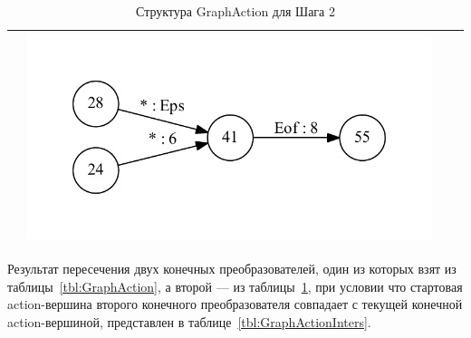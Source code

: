 \documentclass{matmex-diploma}
\begin{document}
\begin{table}[h]
\begin{tabular}{ | c | c | c | c | }
\begin{minipage}{.22\textwidth}
    \end{minipage}
    & 
    \begin{minipage}{.22\textwidth}
      \includegraphics[width=\linewidth]{55_inv}
    \end{minipage}    
    \\ \hline
  \end{tabular}
  \caption{Структура GraphAction для Шага 2}
  \label{tbl:GraphActionInv}
\end{table}

Результат пересечения двух конечных преобразователей, один из которых взят из таблицы~\ref{tbl:GraphAction}, а второй --- из таблицы~\ref{tbl:GraphActionInv}, при условии что стартовая action-вершина второго конечного преобразователя совпадает с текущей конечной action-вершиной, представлен в таблице~\ref{tbl:GraphActionInters}.
\end{document}
